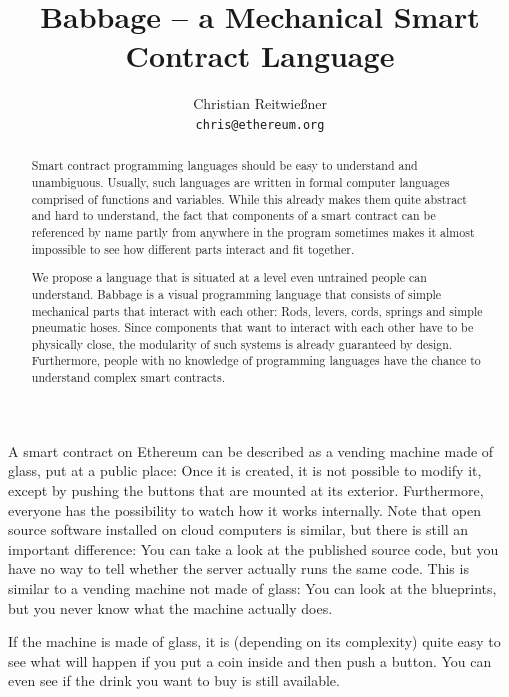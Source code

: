 \documentclass[11pt,letterpaper]{article}
\date{}
\begin{document}


\title{Babbage -- a Mechanical Smart Contract Language}

\author{Christian Reitwießner\\
{\tt chris@ethereum.org}}


\maketitle


\begin{abstract}
\noindent Smart contract programming languages should be easy to understand
and unambiguous. Usually, such languages are written in formal computer languages
comprised of functions and variables. While this already makes them quite
abstract and hard to understand, the fact that components of a smart contract
can be referenced by name partly from anywhere in the program sometimes
makes it almost impossible to see how different parts interact and fit together.

We propose a language that is situated at a level even untrained people can
understand. Babbage is a visual programming language that consists of simple
mechanical parts that interact with each other: Rods, levers, cords, springs
and simple pneumatic hoses. Since components that want to interact with each
other have to be physically close, the modularity of such systems is already
guaranteed by design. Furthermore, people with no knowledge of programming
languages have the chance to understand complex smart contracts.
\end{abstract}

A smart contract on Ethereum can be described as a vending machine made of
glass, put at a public place:
Once it is created, it is not possible to modify it, except by pushing the buttons
that are mounted at its exterior. Furthermore, everyone has the possibility
to watch how it works internally. Note that open source software installed
on cloud computers is similar, but there is still an important difference:
You can take a look at the published source code, but you have no way to tell whether
the server actually runs the same code. This is similar to a vending machine
not made of glass: You can look at the blueprints, but you never know what
the machine actually does.

If the machine is made of glass, it is (depending on its complexity) quite
easy to see what will happen if you put a coin inside and then push a button.
You can even see if the drink you want to buy is still available.
\end{document}
